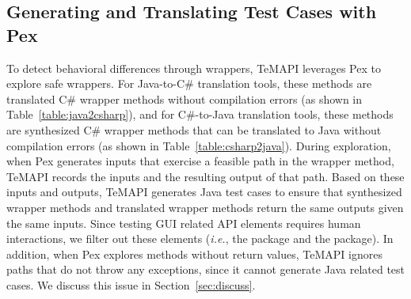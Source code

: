 \subsection{Generating and Translating Test Cases with Pex}
\label{sec:evaluation:single}

To detect behavioral differences through wrappers, TeMAPI leverages Pex to explore safe wrappers. For Java-to-C\# translation tools, these methods are translated C\# wrapper methods without compilation errors (as shown in Table~\ref{table:java2csharp}), and for C\#-to-Java translation tools, these methods are synthesized C\# wrapper methods that can be translated to Java without compilation errors (as shown in Table~\ref{table:csharp2java}). During exploration, when Pex generates inputs that exercise a feasible path in the wrapper method, TeMAPI records the inputs and the resulting output of that path. Based on these inputs and outputs, TeMAPI generates Java test cases to ensure that synthesized wrapper methods and translated wrapper methods return the same outputs given the same inputs. Since testing GUI related API elements requires human interactions, we filter out these elements (\emph{i.e.}, the  package and the  package). In addition, when Pex explores methods without return values, TeMAPI ignores paths that do not throw any exceptions, since it cannot generate Java related test cases. We discuss this issue in Section~\ref{sec:discuss}.


